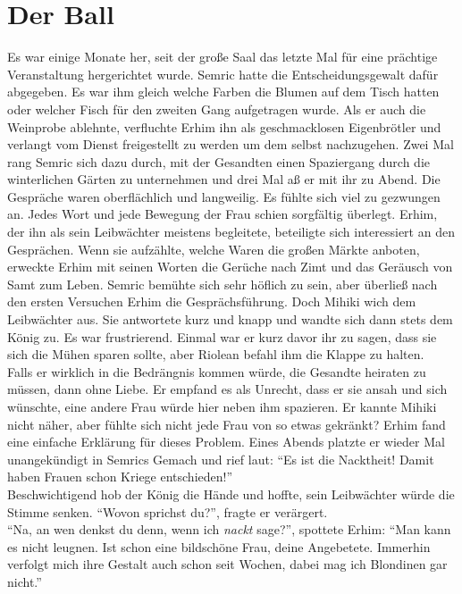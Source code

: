 \chapter{Der Ball}

Es war einige Monate her, seit der große Saal das letzte Mal für eine prächtige Veranstaltung 
hergerichtet wurde. Semric hatte die Entscheidungsgewalt dafür abgegeben. Es war ihm gleich welche 
Farben die Blumen auf dem Tisch hatten oder welcher Fisch für den zweiten Gang aufgetragen wurde. 
Als er auch die Weinprobe ablehnte, verfluchte Erhim ihn als geschmacklosen 
Eigenbrötler und verlangt vom Dienst freigestellt zu werden um dem selbst nachzugehen. 
Zwei Mal rang Semric sich dazu durch, mit der Gesandten einen Spaziergang durch die winterlichen 
Gärten zu unternehmen und drei Mal aß er mit ihr zu Abend. Die Gespräche waren oberflächlich und 
langweilig. Es fühlte sich viel zu gezwungen an. Jedes Wort und jede Bewegung der Frau schien 
sorgfältig überlegt. Erhim, der ihn als sein Leibwächter meistens begleitete, beteiligte sich 
interessiert an den Gesprächen. Wenn sie aufzählte, welche Waren die großen Märkte anboten, 
erweckte Erhim mit seinen Worten die Gerüche nach Zimt und das Geräusch von Samt zum Leben. 
Semric bemühte sich sehr höflich zu sein, aber überließ nach den ersten Versuchen Erhim die 
Gesprächsführung. Doch Mihiki wich dem Leibwächter aus. Sie antwortete kurz und knapp und 
wandte sich dann stets dem König zu. Es war frustrierend. Einmal war er kurz davor ihr zu sagen, 
dass sie sich die Mühen sparen sollte, aber Riolean befahl ihm die Klappe zu halten. \\
Falls er wirklich in die Bedrängnis kommen würde, die Gesandte heiraten zu müssen, dann ohne Liebe. 
Er empfand es als Unrecht, dass er sie ansah und sich wünschte, eine andere Frau würde hier neben 
ihm spazieren. Er kannte Mihiki nicht näher, aber fühlte sich nicht jede Frau von so etwas 
gekränkt? Erhim fand eine einfache Erklärung für dieses Problem. Eines Abends platzte er wieder Mal 
unangekündigt in Semrics Gemach und rief laut: ``Es ist die Nacktheit! Damit haben Frauen schon 
Kriege entschieden!''\\
Beschwichtigend hob der König die Hände und hoffte, sein Leibwächter würde die Stimme senken. 
``Wovon sprichst du?'', fragte er verärgert.\\
``Na, an wen denkst du denn, wenn ich \textit{nackt} sage?'', spottete Erhim: ``Man kann es nicht 
leugnen. Ist schon eine bildschöne Frau, deine Angebetete. Immerhin verfolgt mich ihre Gestalt auch 
schon seit Wochen, dabei mag ich Blondinen gar nicht.''\\
